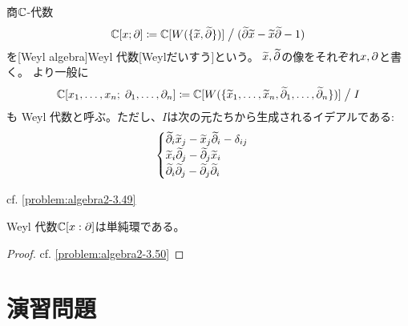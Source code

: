 \documentclass[report]{jlreq}
\begin{document}
\begin{definition}[Weyl 代数]
    商$\mathbb{C}$-代数
    \begin{equation}
        \mathbb{C}[x; \partial] \coloneqq \mathbb{C}[W(\{ \widetilde{x}, \widetilde{\partial} \})]
            \; \big/ \; (\widetilde{\partial} \widetilde{x} - \widetilde{x} \widetilde{\partial} - 1)
    \end{equation}
    を[Weyl algebra]{Weyl 代数}[Weylだいすう]という。
    $\widetilde{x}, \widetilde{\partial}$の像をそれぞれ$x, \partial$と書く。
    より一般に
    \begin{equation}
        \mathbb{C}[x_1, \dots, x_n; \; \partial_1, \dots, \partial_n]
            \coloneqq \mathbb{C}[
                W(\{ \widetilde{x}_1, \dots, \widetilde{x}_n, \widetilde{\partial}_1, \dots, \widetilde{\partial}_n \})
            ] \; \big/ \; I
    \end{equation}
    も Weyl 代数と呼ぶ。ただし、$I$は次の元たちから生成されるイデアルである:
    \begin{equation}
        \begin{cases}
            \widetilde{\partial}_i \widetilde{x}_j - \widetilde{x}_j \widetilde{\partial}_i - \delta_{ij} \\
            \widetilde{x}_i \widetilde{\partial}_j - \widetilde{\partial}_j \widetilde{x}_i \\
            \widetilde{\partial}_i \widetilde{\partial}_j - \widetilde{\partial}_j \widetilde{\partial}_i
        \end{cases}
    \end{equation}
\end{definition}

\begin{definition}[標準基底と標準形]
    cf. \cref{problem:algebra2-3.49}
    \TODO{}
\end{definition}

\begin{proposition}[次数]
    \TODO{}
\end{proposition}

\begin{proposition}
    Weyl 代数$\mathbb{C}[x : \partial]$は単純環である。
\end{proposition}

\begin{proof}
    cf. \cref{problem:algebra2-3.50}
\end{proof}




%
\newpage
\section{演習問題}
\end{document}
